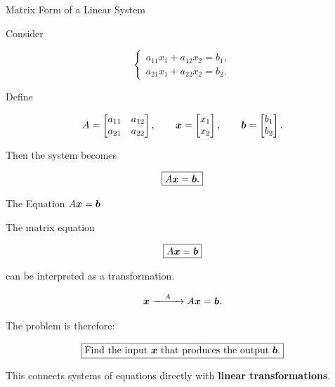 \begin{frame}{Matrix Form of a Linear System}

Consider

\[
\begin{cases}
a_{11}x_1+a_{12}x_2=b_1,\\
a_{21}x_1+a_{22}x_2=b_2.
\end{cases}
\]

Define

\[
A=
\begin{bmatrix}
a_{11}&a_{12}\\
a_{21}&a_{22}
\end{bmatrix},
\qquad
\bm{x}
=
\begin{bmatrix}
x_1\\
x_2
\end{bmatrix},
\qquad
\bm{b}
=
\begin{bmatrix}
b_1\\
b_2
\end{bmatrix}.
\]

Then the system becomes

\[
\boxed{
A\bm{x}=\bm{b}.
}
\]

\end{frame}



\begin{frame}{The Equation $A\bm{x}=\bm{b}$}

The matrix equation

\[
\boxed{
A\bm{x}=\bm{b}
}
\]

can be interpreted as a transformation.

\[
\bm{x}
\xrightarrow{\quad A\quad}
A\bm{x}
=
\bm{b}.
\]

\vspace{0.5cm}

The problem is therefore:

\[
\boxed{
\text{Find the input }\bm{x}
\text{ that produces the output }\bm{b}.
}
\]

\vspace{0.4cm}

This connects systems of equations directly with
\textbf{linear transformations}.

\end{frame}



